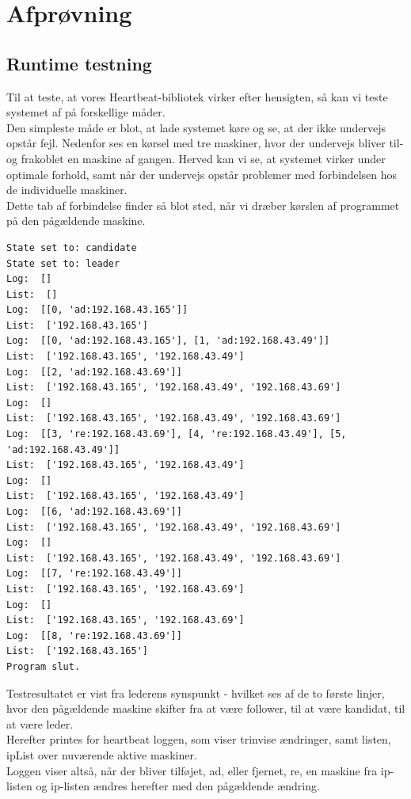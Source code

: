 \documentclass[a4paper,12pt]{article}
\begin{document}
\section{Afprøvning} 
\subsection{Runtime testning}
Til at teste, at vores Heartbeat-bibliotek virker efter hensigten, så kan vi teste systemet af på forskellige måder.
\\
Den simpleste måde er blot, at lade systemet køre og se, at der ikke undervejs opstår fejl.
Nedenfor ses en kørsel med tre maskiner, hvor der undervejs bliver til- og frakoblet en maskine af gangen. Herved kan vi se, at systemet virker under optimale forhold, samt når der undervejs opstår problemer med forbindelsen hos de individuelle maskiner. 
\\
Dette tab af forbindelse finder så blot sted, når vi dræber kørslen af programmet på den pågældende maskine.
\begin{lstlisting}
State set to: candidate
State set to: leader
Log:  []
List:  []
Log:  [[0, 'ad:192.168.43.165']]
List:  ['192.168.43.165']
Log:  [[0, 'ad:192.168.43.165'], [1, 'ad:192.168.43.49']]
List:  ['192.168.43.165', '192.168.43.49']
Log:  [[2, 'ad:192.168.43.69']]
List:  ['192.168.43.165', '192.168.43.49', '192.168.43.69']
Log:  []
List:  ['192.168.43.165', '192.168.43.49', '192.168.43.69']
Log:  [[3, 're:192.168.43.69'], [4, 're:192.168.43.49'], [5, 'ad:192.168.43.49']]
List:  ['192.168.43.165', '192.168.43.49']
Log:  []
List:  ['192.168.43.165', '192.168.43.49']
Log:  [[6, 'ad:192.168.43.69']]
List:  ['192.168.43.165', '192.168.43.49', '192.168.43.69']
Log:  []
List:  ['192.168.43.165', '192.168.43.49', '192.168.43.69']
Log:  [[7, 're:192.168.43.49']]
List:  ['192.168.43.165', '192.168.43.69']
Log:  []
List:  ['192.168.43.165', '192.168.43.69']
Log:  [[8, 're:192.168.43.69']]
List:  ['192.168.43.165']
Program slut.
\end{lstlisting}
Testresultatet er vist fra lederens synspunkt - hvilket ses af de to første linjer, hvor den pågældende maskine skifter fra at være follower, til at være kandidat, til at være leder.
\\
Herefter printes for heartbeat loggen, som viser trinvise ændringer, samt listen, ipList over nuværende aktive maskiner.
\\
Loggen viser altså, når der bliver tilføjet, ad, eller fjernet, re, en maskine fra ip-listen og ip-listen ændres herefter med den pågældende ændring.
\end{document}
